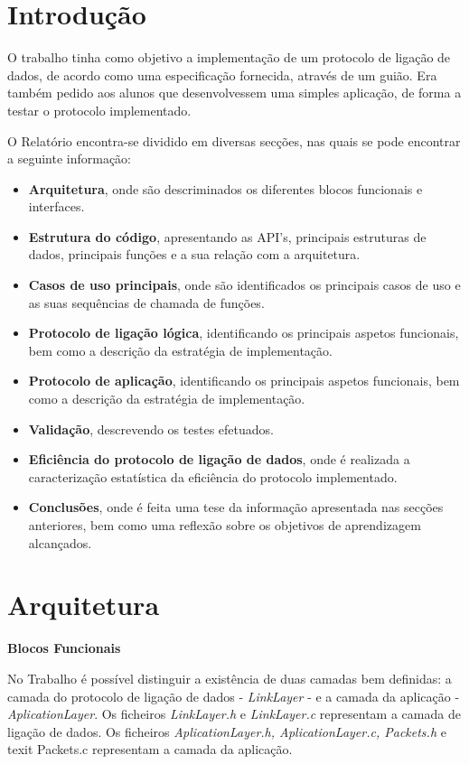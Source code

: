 \documentclass[a4paper, 11pt]{article}
\begin{document}
\section{Introdução}

O trabalho tinha como objetivo a implementação de um protocolo de ligação de dados, de acordo como uma especificação fornecida, através de um guião. Era também pedido aos alunos que desenvolvessem uma simples aplicação, de forma a testar o protocolo implementado.

O Relatório encontra-se dividido em diversas secções, nas quais se pode encontrar a seguinte informação:
\begin{itemize}
	\item \textbf{Arquitetura}, onde são descriminados os diferentes blocos funcionais e interfaces.
	\item \textbf{Estrutura do código}, apresentando as API's, principais estruturas de dados, principais funções e a sua relação com a arquitetura.
	\item \textbf{Casos de uso principais}, onde são identificados os principais casos de uso e as suas sequências de chamada de funções.
	\item \textbf{Protocolo de ligação lógica}, identificando os principais aspetos funcionais, bem como a descrição da estratégia de implementação.
	\item \textbf{Protocolo de aplicação},  identificando os principais aspetos funcionais, bem como a descrição da estratégia de implementação.
	\item \textbf{Validação}, descrevendo os testes efetuados.
	\item \textbf{Eficiência do protocolo de ligação de dados}, onde é realizada a caracterização estatística da eficiência do protocolo implementado.
	\item \textbf{Conclusões}, onde é feita uma tese da informação apresentada nas secções anteriores, bem como uma reflexão sobre os objetivos de aprendizagem alcançados.
\end{itemize}

\section{Arquitetura}

\large\textbf{Blocos Funcionais}\\
\normalsize 

No Trabalho é possível distinguir a existência de duas camadas bem definidas:  a camada do protocolo de ligação de dados - \textit{LinkLayer} - e a camada da aplicação - \textit{AplicationLayer}.
Os ficheiros \textit{LinkLayer.h} e  \textit{LinkLayer.c} representam a camada de ligação de dados. Os ficheiros \textit{AplicationLayer.h, AplicationLayer.c, Packets.h} e \\texit{ Packets.c} representam a camada da aplicação.
\end{document}
